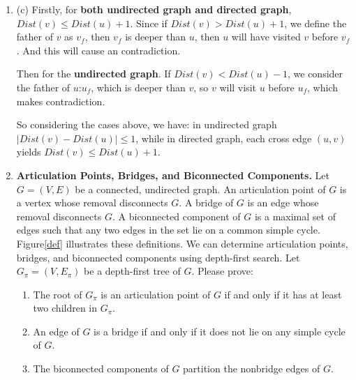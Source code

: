 \documentclass[12pt,a4paper]{article}
\makeatletter
\newtheorem*{solution}{Solution}
\theoremstyle{definition}
\renewenvironment{solution}[1][Solution] {\par\pushQED{\qed}\normalfont\topsep6\p@\@plus6\p@\relax\trivlist\item[\hskip\labelsep\bfseries#1\@addpunct{.}]\ignorespaces}{\popQED\endtrivlist\@endpefalse} \makeatother
\makeatother
\begin{document}
\begin{enumerate}
\begin{solution}
	   (c)
	   Firstly, for \textbf{both undirected graph and directed graph}, $Dist(v) \leq Dist(u) + 1$. Since if $Dist(v) > Dist(u) + 1$, we define the father of $v$ as $v_f$,
	   then $v_f$ is deeper than $u$, then $u$ will have visited $v$ before $v_f$. And this will cause an contradiction.
	   
	   Then for the \textbf{undirected graph}. If $Dist(v) < Dist(u) - 1$, we consider the father of $u$:$u_f$, which is deeper than $v$, so $v$ will visit $u$ before $u_f$, which makes contradiction.

	   So considering the cases above, we have: in undirected graph $|Dist(v)-Dist(u)|\le 1$, while in directed graph, each cross edge $(u,v)$ yields $Dist(v)\leq Dist(u)+1$.


	  

   \end{solution}





    \item 
    \textbf{Articulation Points, Bridges, and Biconnected Components.} Let $G=(V, E)$ be a connected, undirected graph. An articulation point of $G$ is a vertex whose removal disconnects $G$. A bridge of $G$ is an edge whose removal disconnects $G .$ A biconnected component of $G$ is a maximal set of edges such that any two edges in the set lie on a common simple cycle. Figure\ref{def} illustrates these definitions. We can determine articulation points, bridges, and biconnected components using depth-first search. Let $G_{\pi}=\left(V, E_{\pi}\right)$ be a depth-first tree of $G$. Please prove:
    
    \begin{enumerate}
    	\item The root of $G_{\pi}$ is an articulation point of $G$ if and only if it has at least two children in $G_{\pi}$.
    	\item An edge of $G$ is a bridge if and only if it does not lie on any simple cycle of $G$.
    	\item The biconnected components of $G$ partition the nonbridge edges of $G$.
    \end{enumerate}

	 \begin{figure}[htbp]
	 	

\end{figure}
\end{enumerate}
\end{document}
